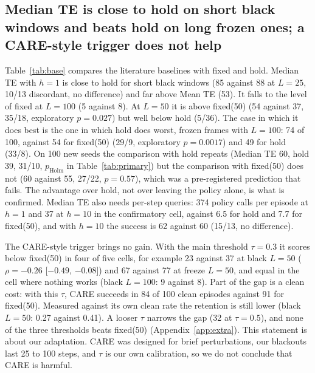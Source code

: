 \documentclass[11pt]{article}
\newcommand{\hold}{\textsf{hold}\xspace}
\newcommand{\fixed}{\textsf{fixed}\xspace}
\begin{document}
\subsection{Median TE is close to hold on short black windows and beats hold on long frozen ones; a CARE-style trigger does not help}
\label{sec:res-base}

\begin{table}[t]
\centering\small
\resizebox{\textwidth}{!}{}
\caption{TC, literature baselines against \fixed and \hold on the same loop, 100 seeds, except that the clean column of \fixed and Mean TE comes from the LeRobot loop. Counts are successes. Column headers give fault and $L$. ``calls/ep'': mean number of policy calls per episode in the freeze, $L{=}100$ cell. The clean column of \hold is that of \fixed(50).}
\label{tab:base}
\end{table}

Table~\ref{tab:base} compares the literature baselines with \fixed and \hold. Median TE with $h{=}1$ is close to hold for short black windows (85 against 88 at $L{=}25$, 10/13 discordant, no difference) and far above Mean TE (53). It falls to the level of \fixed at $L{=}100$ (5 against 8). At $L{=}50$ it is above \fixed(50) (54 against 37, 35/18, exploratory $p=0.027$) but well below hold (5/36). The case in which it does best is the one in which hold does worst, frozen frames with $L{=}100$: 74 of 100, against 54 for \fixed(50) (29/9, exploratory $p=0.0017$) and 49 for hold (33/8). On 100 new seeds the comparison with hold repeats (Median TE 60, hold 39, 31/10, $p_{\mathrm{Holm}}$ in Table~\ref{tab:primary}) but the comparison with \fixed(50) does not (60 against 55, 27/22, $p=0.57$), which was a pre-registered prediction that fails. The advantage over hold, not over leaving the policy alone, is what is confirmed. Median TE also needs per-step queries: 374 policy calls per episode at $h{=}1$ and 37 at $h{=}10$ in the confirmatory cell, against 6.5 for hold and 7.7 for \fixed(50), and with $h{=}10$ the success is 62 against 60 (15/13, no difference).

The CARE-style trigger brings no gain. With the main threshold $\tau{=}0.3$ it scores below \fixed(50) in four of five cells, for example 23 against 37 at black $L{=}50$ ($\rho=-0.26$ [$-0.49$, $-0.08$]) and 67 against 77 at freeze $L{=}50$, and equal in the cell where nothing works (black $L{=}100$: 9 against 8). Part of the gap is a clean cost: with this $\tau$, CARE succeeds in 84 of 100 clean episodes against 91 for \fixed(50). Measured against its own clean rate the retention is still lower (black $L{=}50$: 0.27 against 0.41). A looser $\tau$ narrows the gap (32 at $\tau{=}0.5$), and none of the three thresholds beats \fixed(50) (Appendix~\ref{app:extra}). This statement is about our adaptation. CARE was designed for brief perturbations, our blackouts last 25 to 100 steps, and $\tau$ is our own calibration, so we do not conclude that CARE is harmful.
\end{document}
